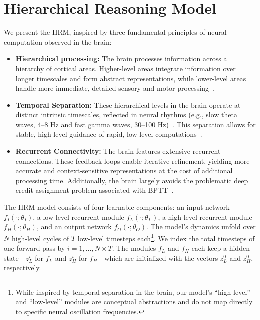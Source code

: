 \section{Hierarchical Reasoning Model}

We present the HRM, inspired by three fundamental principles of neural computation observed in the brain:

\begin{itemize}
  \item \textbf{Hierarchical processing:} The brain processes information across a hierarchy of cortical areas. Higher-level areas integrate information over longer timescales and form abstract representations, while lower-level areas handle more immediate, detailed sensory and motor processing~\citep{murray2014hierarchy, huntenburg2018large,zeraati2023intrinsic}.
  \item \textbf{Temporal Separation:} These hierarchical levels in the brain operate at distinct intrinsic timescales, reflected in neural rhythms (e.g., slow theta waves, 4–8 Hz and fast gamma waves, 30–100 Hz)~\citep{buzsaki2000gamma, buzsaki2006rhythms}. This separation allows for stable, high-level guidance of rapid, low-level computations~\citep{pahor2014theta, tort2009theta}.
  \item \textbf{Recurrent Connectivity:} The brain features extensive recurrent connections. These feedback loops enable iterative refinement, yielding more accurate and context-sensitive representations at the cost of additional processing time. Additionally, the brain largely avoids the problematic deep credit assignment problem associated with BPTT~\citep{LILLICRAP201982}.
\end{itemize}


The HRM model consists of four learnable components: an input network $f_I(\cdot; \theta_I)$, a low-level recurrent module $f_L(\cdot; \theta_L)$, a high-level recurrent module $f_H(\cdot; \theta_H)$, and an output network $f_O(\cdot; \theta_O)$. The model's dynamics unfold over $N$ high-level cycles of $T$ low-level timesteps each\footnote{While inspired by temporal separation in the brain, our model's ``high-level'' and ``low-level'' modules are conceptual abstractions and do not map directly to specific neural oscillation frequencies.}. We index the total timesteps of one forward pass by $i = 1, \dots, N \times T$. The modules $f_L$ and $f_H$ each keep a hidden state---$z_L^i$ for $f_L$ and $z_H^i$ for $f_H$---which are initialized with the vectors $z_L^0$ and $z_H^0$, respectively.  

